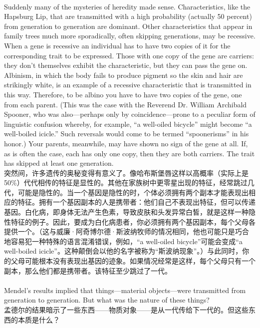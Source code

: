 \documentclass{article}
\begin{document}
\\
Suddenly many of the mysteries of heredity made sense. Characteristics, like the Hapsburg Lip, that are transmitted with a high probability (actually 50 percent) from generation to generation are dominant. Other characteristics that appear in family trees much more sporadically, often skipping generations, may be recessive. When a gene is recessive an individual has to have two copies of it for the corresponding trait to be expressed. Those with one copy of the gene are carriers: they don’t themselves exhibit the characteristic, but they can pass the gene on. Albinism, in which the body fails to produce pigment so the skin and hair are strikingly white, is an example of a recessive characteristic that is transmitted in this way. Therefore, to be albino you have to have two copies of the gene, one from each parent. (This was the case with the Reverend Dr. William Archibald Spooner, who was also—perhaps only by coincidence—prone to a peculiar form of linguistic confusion whereby, for example, “a well-oiled bicycle” might become “a well-boiled icicle.” Such reversals would come to be termed “spoonerisms” in his honor.) Your parents, meanwhile, may have shown no sign of the gene at all. If, as is often the case, each has only one copy, then they are both carriers. The trait has skipped at least one generation.\\
突然间，许多遗传的奥秘变得有意义了。像哈布斯堡唇这样以高概率（实际上是50\%）代代相传的特征是显性的。其他在家族树中更零星出现的特征，经常跳过几代，可能是隐性的。当一个基因是隐性的时，个体必须拥有两个副本才能表现出相应的特征。拥有一个基因副本的人是携带者：他们自己不表现出特征，但可以传递基因。白化病，即身体无法产生色素，导致皮肤和头发异常白皙，就是这样一种隐性特征的例子。因此，要成为白化病患者，你必须拥有两个基因副本，每个父母各提供一个。（这与威廉·阿奇博尔德·斯波纳牧师的情况相同，他也可能只是巧合地容易犯一种特殊的语言混淆错误，例如，“a well-oiled bicycle”可能会变成“a well-boiled icicle”。这种颠倒会以他的名字被称为“斯波纳现象”。）与此同时，你的父母可能根本没有表现出基因的迹象。如果情况经常是这样，每个父母只有一个副本，那么他们都是携带者。该特征至少跳过了一代。\\

\\
Mendel’s results implied that things—material objects—were transmitted from generation to generation. But what was the nature of these things?\\
孟德尔的结果暗示了一些东西——物质对象——是从一代传给下一代的。但这些东西的本质是什么？\\
\end{document}
